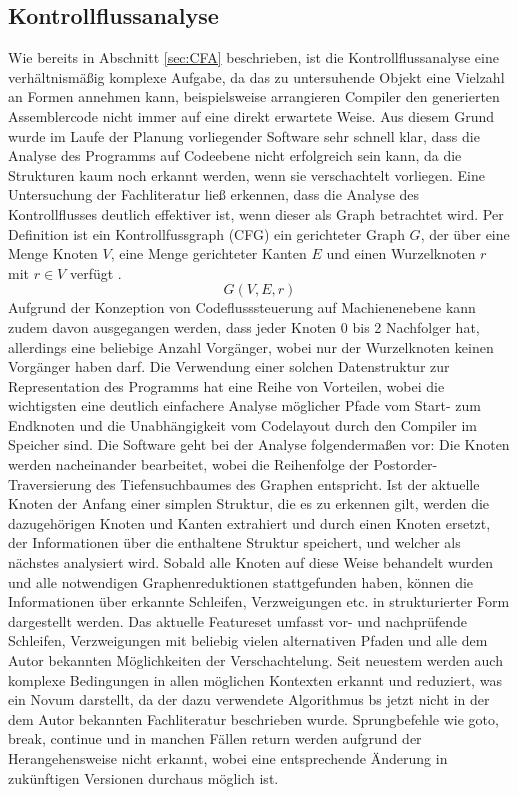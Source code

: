 \documentclass[11pt]{article} %
\begin{document}
\subsection{Kontrollflussanalyse} Wie bereits in Abschnitt \ref{sec:CFA} beschrieben, ist die
Kontrollflussanalyse eine verhältnismäßig komplexe Aufgabe, da das zu untersuhende Objekt eine
Vielzahl an Formen annehmen kann, beispielsweise arrangieren Compiler den generierten Assemblercode
nicht immer auf eine direkt erwartete Weise. Aus diesem Grund wurde im Laufe der Planung
vorliegender Software sehr schnell klar, dass die Analyse des Programms auf Codeebene nicht
erfolgreich sein kann, da die Strukturen kaum noch erkannt werden, wenn sie verschachtelt vorliegen.
Eine Untersuchung der Fachliteratur ließ erkennen, dass die Analyse des Kontrollflusses deutlich
effektiver ist, wenn dieser als Graph betrachtet wird. Per Definition ist ein Kontrollfussgraph
(CFG) ein gerichteter Graph \(G\), der über eine Menge Knoten \(V\), eine Menge gerichteter Kanten
\(E\) und einen Wurzelknoten \(r\) mit \(r \in V\) verfügt \cite{wiki1:3}. \[G(V,E,r)\] Aufgrund der
Konzeption von Codeflusssteuerung auf Machienenebene kann zudem davon ausgegangen werden, dass jeder
Knoten 0 bis 2 Nachfolger hat, allerdings eine beliebige Anzahl Vorgänger, wobei nur der
Wurzelknoten keinen Vorgänger haben darf. Die Verwendung einer solchen Datenstruktur zur
Representation des Programms hat eine Reihe von Vorteilen, wobei die wichtigsten eine deutlich
einfachere Analyse möglicher Pfade vom Start- zum Endknoten und die Unabhängigkeit vom Codelayout
durch den Compiler im Speicher sind.  Die Software geht bei der Analyse folgendermaßen vor: Die
Knoten werden nacheinander bearbeitet, wobei die Reihenfolge der Postorder-Traversierung des
Tiefensuchbaumes des Graphen entspricht. Ist der aktuelle Knoten der Anfang einer simplen Struktur,
die es zu erkennen gilt, werden die dazugehörigen Knoten und Kanten extrahiert und durch einen
Knoten ersetzt, der Informationen über die enthaltene Struktur speichert, und welcher als nächstes
analysiert wird. Sobald alle Knoten auf diese Weise behandelt wurden und alle notwendigen
Graphenreduktionen stattgefunden haben, können die Informationen über erkannte Schleifen,
Verzweigungen etc. in strukturierter Form dargestellt werden. Das aktuelle Featureset umfasst vor-
und nachprüfende Schleifen, Verzweigungen mit beliebig vielen alternativen Pfaden und alle dem Autor
bekannten Möglichkeiten der Verschachtelung. Seit neuestem werden auch komplexe Bedingungen in allen
möglichen Kontexten erkannt und reduziert, was ein Novum darstellt, da der dazu verwendete
Algorithmus bs jetzt nicht in der dem Autor bekannten Fachliteratur beschrieben wurde. Sprungbefehle
wie goto, break, continue und in manchen Fällen return werden aufgrund der Herangehensweise nicht
erkannt, wobei eine entsprechende Änderung in zukünftigen Versionen durchaus möglich ist.
\end{document}
